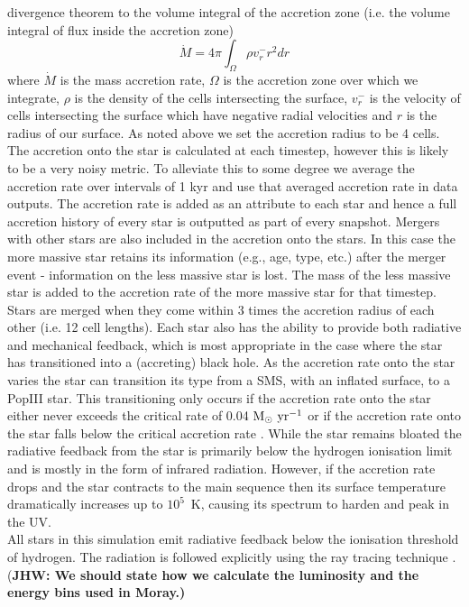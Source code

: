 \documentclass[graphics, twocolumn, usenatbib]{mn2e}
\newcommand{\msolaryr} {$\rm{M_{\odot}~yr^{-1}}~$}
\newcommand{\jhw}[1]{{\color{Maroon} (\bf JHW: #1)}}
\begin{document}
divergence theorem to the volume integral of the accretion zone \citep[e.g][]{Bleuler_2014}
(i.e. the volume integral of flux inside the accretion zone)
\begin{equation}
  \dot{M} = 4\pi \int_\Omega { \rho v_r^- r^2 dr}
\end{equation}
where $\dot{M}$ is the mass accretion rate, $\Omega$ is the accretion zone over which we integrate,
$\rho$ is the
density of the cells intersecting the surface, $v_r^-$ is the velocity of cells intersecting
the surface which have negative radial velocities and $r$ is the radius of our surface. As noted above we
set the accretion radius to be 4 cells. The accretion onto the star is calculated at each timestep,
however this is likely to be a very noisy metric. To alleviate this to some degree we average
the accretion rate over intervals of 1 kyr and use that averaged accretion rate in data outputs. The accretion rate is added as an attribute to each star and hence a full
accretion history of every star is outputted as part of every snapshot. Mergers with other stars
are also included in the accretion onto the stars. In this case the more massive star retains its
information (e.g., age, type, etc.) after the merger event - information on the less massive star is
lost. The mass of the less massive star is added to the accretion rate of the more massive star for
that timestep. Stars are merged when they come within 3 times the accretion radius of each other (i.e. 12 cell lengths).
\indent Each star also has the ability to provide both radiative and mechanical feedback, which is
most appropriate in the case where the star has transitioned into a (accreting) black hole. As the
accretion rate onto the star varies the star can transition its type from a SMS, with an inflated
surface, to a PopIII star.  This transitioning only occurs if the accretion rate onto the star either
never exceeds the critical rate of 0.04 \msolaryr or if the accretion rate onto the star falls below
the critical accretion rate \citep{Sakurai_2016}. While the star remains bloated the radiative
feedback from the star is primarily below the hydrogen ionisation limit and is mostly in the
form of infrared radiation. However, if the accretion rate drops and the star contracts to the
main sequence then its surface temperature dramatically increases up to $10^5$~K,
causing its spectrum to harden and peak in the UV. \\
\indent All stars in this simulation emit radiative feedback below the ionisation threshold of
hydrogen. The radiation is followed explicitly using the ray tracing technique \citep{WiseAbel_2011}. \jhw{We should state how we calculate the luminosity and the energy bins used in Moray.}
\end{document}
